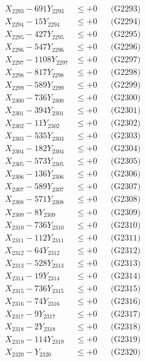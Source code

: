 \documentclass[a4paper,10pt]{article}
\begin{document}
{\begin{align}
X_{2293} - 691Y_{2293} &\leq +0 && \text{(G2293)} \\
X_{2294} - 15Y_{2294} &\leq +0 && \text{(G2294)} \\
X_{2295} - 427Y_{2295} &\leq +0 && \text{(G2295)} \\
X_{2296} - 547Y_{2296} &\leq +0 && \text{(G2296)} \\
X_{2297} - 1108Y_{2297} &\leq +0 && \text{(G2297)} \\
X_{2298} - 817Y_{2298} &\leq +0 && \text{(G2298)} \\
X_{2299} - 589Y_{2299} &\leq +0 && \text{(G2299)} \\
X_{2300} - 736Y_{2300} &\leq +0 && \text{(G2300)} \\
\allowbreak
X_{2301} - 394Y_{2301} &\leq +0 && \text{(G2301)} \\
X_{2302} - 11Y_{2302} &\leq +0 && \text{(G2302)} \\
X_{2303} - 535Y_{2303} &\leq +0 && \text{(G2303)} \\
X_{2304} - 182Y_{2304} &\leq +0 && \text{(G2304)} \\
X_{2305} - 573Y_{2305} &\leq +0 && \text{(G2305)} \\
X_{2306} - 136Y_{2306} &\leq +0 && \text{(G2306)} \\
X_{2307} - 589Y_{2307} &\leq +0 && \text{(G2307)} \\
X_{2308} - 571Y_{2308} &\leq +0 && \text{(G2308)} \\
X_{2309} - 8Y_{2309} &\leq +0 && \text{(G2309)} \\
X_{2310} - 736Y_{2310} &\leq +0 && \text{(G2310)} \\
\allowbreak
X_{2311} - 112Y_{2311} &\leq +0 && \text{(G2311)} \\
X_{2312} - 64Y_{2312} &\leq +0 && \text{(G2312)} \\
X_{2313} - 528Y_{2313} &\leq +0 && \text{(G2313)} \\
X_{2314} - 19Y_{2314} &\leq +0 && \text{(G2314)} \\
X_{2315} - 736Y_{2315} &\leq +0 && \text{(G2315)} \\
X_{2316} - 74Y_{2316} &\leq +0 && \text{(G2316)} \\
X_{2317} - 9Y_{2317} &\leq +0 && \text{(G2317)} \\
X_{2318} - 2Y_{2318} &\leq +0 && \text{(G2318)} \\
X_{2319} - 114Y_{2319} &\leq +0 && \text{(G2319)} \\
X_{2320} - Y_{2320} &\leq +0 && \text{(G2320)} \\

\end{align}}
\end{document}
